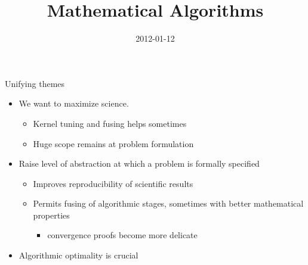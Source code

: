 \documentclass{beamer}
\title{Mathematical Algorithms}
\date{2012-01-12}
\begin{document}
\lstset{language=C}
\normalem

\begin{frame}
  \titlepage
\end{frame}

\begin{frame}{Unifying themes}
  \begin{itemize}
  \item We want to \alert{\large maximize science}.
    \begin{itemize}
    \item Kernel tuning and fusing helps sometimes
    \item Huge scope remains at problem formulation
    \end{itemize}
  \item Raise level of abstraction at which a problem is formally specified
    \begin{itemize}
    \item Improves reproducibility of scientific results
    \item Permits fusing of algorithmic stages, sometimes with better mathematical properties
      \begin{itemize}
      \item convergence proofs become more delicate
      \end{itemize}
    \end{itemize}
  \item Algorithmic optimality is crucial
  \end{itemize}
\end{frame}
\end{document}
